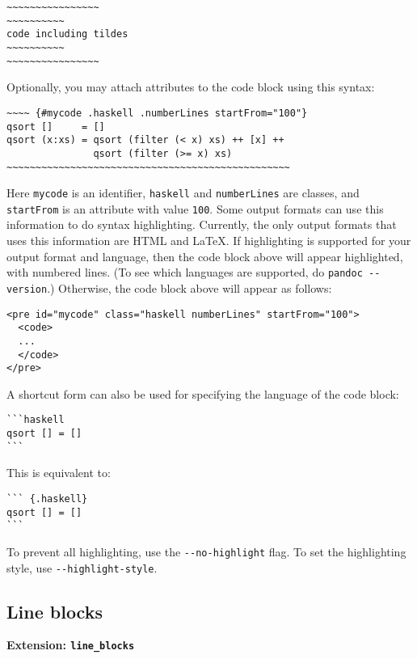 \documentclass[]{article}
\begin{document}
\begin{verbatim}
~~~~~~~~~~~~~~~~
~~~~~~~~~~
code including tildes
~~~~~~~~~~
~~~~~~~~~~~~~~~~
\end{verbatim}

Optionally, you may attach attributes to the code block using this
syntax:

\begin{verbatim}
~~~~ {#mycode .haskell .numberLines startFrom="100"}
qsort []     = []
qsort (x:xs) = qsort (filter (< x) xs) ++ [x] ++
               qsort (filter (>= x) xs)
~~~~~~~~~~~~~~~~~~~~~~~~~~~~~~~~~~~~~~~~~~~~~~~~~
\end{verbatim}

Here \texttt{mycode} is an identifier, \texttt{haskell} and
\texttt{numberLines} are classes, and \texttt{startFrom} is an attribute
with value \texttt{100}. Some output formats can use this information to
do syntax highlighting. Currently, the only output formats that uses
this information are HTML and LaTeX. If highlighting is supported for
your output format and language, then the code block above will appear
highlighted, with numbered lines. (To see which languages are supported,
do \texttt{pandoc -{}-version}.) Otherwise, the code block above will
appear as follows:

\begin{verbatim}
<pre id="mycode" class="haskell numberLines" startFrom="100">
  <code>
  ...
  </code>
</pre>
\end{verbatim}

A shortcut form can also be used for specifying the language of the code
block:

\begin{verbatim}
```haskell
qsort [] = []
```
\end{verbatim}

This is equivalent to:

\begin{verbatim}
``` {.haskell}
qsort [] = []
```
\end{verbatim}

To prevent all highlighting, use the \texttt{-{}-no-highlight} flag. To
set the highlighting style, use \texttt{-{}-highlight-style}.

\subsection{Line blocks}

\textbf{Extension: \texttt{line\_blocks}}
\end{document}
